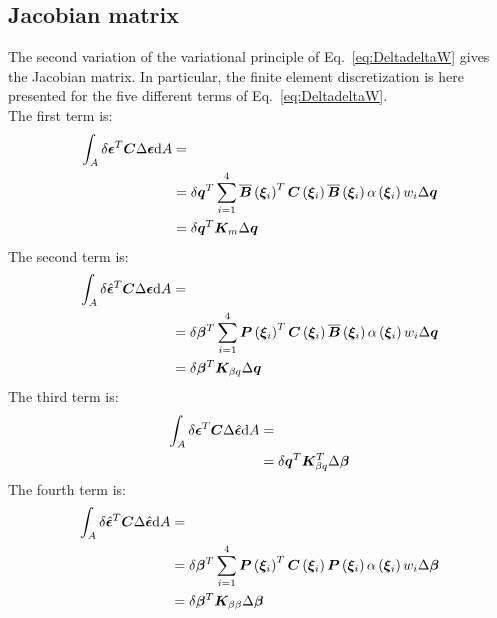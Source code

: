 \subsection{Jacobian matrix}
The second variation of the variational principle of Eq.~\ref{eq:DeltadeltaW} gives the Jacobian matrix. In particular, the finite element discretization is here presented for the five different terms of Eq.~\ref{eq:DeltadeltaW}.\\
The first term is:
\begin{equation}
\begin{split}
\int_A \delta {\bm{\epsilon}} ^T  \bm{C}  \Delta {\bm{\epsilon}}  \text{d}A & = \\
& = \delta{\bm{q}}^T  \sum_{i=1}^{4} \overline{\bm{B}}\left(  \bm{ \xi }_{ i }  \right)^T  \bm{C}\left(  \bm{ \xi }_{ i }  \right)  \overline{\bm{B}}\left(  \bm{ \xi }_{ i }  \right)  \alpha \left(  \bm{ \xi }_{ i }  \right)   w_i \Delta \bm{q} \\
& = \delta{\bm{q}}^T  \bm{K}_m  \Delta \bm{q}
\end{split}
\end{equation}
The second term is:
\begin{equation}
\begin{split}
\int_A  \delta \hat{{\bm{\epsilon}}} ^T  \bm{C}  \Delta {\bm{\epsilon}} \text{d}A & = \\
& = \delta{\bm{\beta}}^T  \sum_{i=1}^{4} \bm{P}\left(  \bm{ \xi }_{ i }  \right)^T  \bm{C}\left(  \bm{ \xi }_{ i }  \right)  \overline{\bm{B}}\left(  \bm{ \xi }_{ i }  \right)  \alpha \left(  \bm{ \xi }_{ i }  \right)  w_i \Delta \bm{q} \\
& = \delta{\bm{\beta}}^T  \bm{K}_{\beta q}  \Delta \bm{q}
\end{split}
\end{equation}
The third term is:
\begin{equation}
\begin{split}
\int_A \delta {\bm{\epsilon}} ^T  \bm{C}  \Delta \hat{{\bm{\epsilon}}} \text{d}A & = \\
& = \delta{\bm{q}}^T  \bm{K}_{\beta q}^T  \Delta \bm{\beta}
\end{split}
\end{equation}
The fourth term is:
\begin{equation}
\begin{split}
\int_A \delta \hat{{\bm{\epsilon}}} ^T  \bm{C}  \Delta \hat{{\bm{\epsilon}}} \text{d}A & = \\
& = \delta{\bm{\beta}}^T  \sum_{i=1}^{4} \bm{P}\left(  \bm{ \xi }_{ i }  \right)^T  \bm{C}\left(  \bm{ \xi }_{ i }  \right)  \bm{P}\left(  \bm{ \xi }_{ i }  \right)  \alpha \left(  \bm{ \xi }_{ i }  \right)  w_i \Delta \bm{\beta} \\
& = \delta{\bm{\beta}}^T  \bm{K}_{\beta \beta}  \Delta \bm{\beta}
\end{split}
\end{equation}
